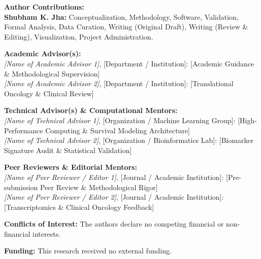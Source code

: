 \documentclass[10pt,a4paper,twocolumn]{article}
\begin{document}
\noindent\textbf{Author Contributions:} \\
\textbf{Shubham K. Jha:} Conceptualization, Methodology, Software, Validation, Formal Analysis, Data Curation, Writing (Original Draft), Writing (Review \& Editing), Visualization, Project Administration.

\vspace{0.5em}
\noindent\textbf{Academic Advisor(s):} \\
\textit{[Name of Academic Advisor 1]}, [Department / Institution]: [Academic Guidance \& Methodological Supervision] \\
\textit{[Name of Academic Advisor 2]}, [Department / Institution]: [Translational Oncology \& Clinical Review]

\vspace{0.5em}
\noindent\textbf{Technical Advisor(s) \& Computational Mentors:} \\
\textit{[Name of Technical Advisor 1]}, [Organization / Machine Learning Group]: [High-Performance Computing \& Survival Modeling Architecture] \\
\textit{[Name of Technical Advisor 2]}, [Organization / Bioinformatics Lab]: [Biomarker Signature Audit \& Statistical Validation]

\vspace{0.5em}
\noindent\textbf{Peer Reviewers \& Editorial Mentors:} \\
\textit{[Name of Peer Reviewer / Editor 1]}, [Journal / Academic Institution]: [Pre-submission Peer Review \& Methodological Rigor] \\
\textit{[Name of Peer Reviewer / Editor 2]}, [Journal / Academic Institution]: [Transcriptomics \& Clinical Oncology Feedback]

\vspace{0.5em}
\noindent\textbf{Conflicts of Interest:} The authors declare no competing financial or non-financial interests.

\vspace{0.5em}
\noindent\textbf{Funding:} This research received no external funding.
\end{document}
